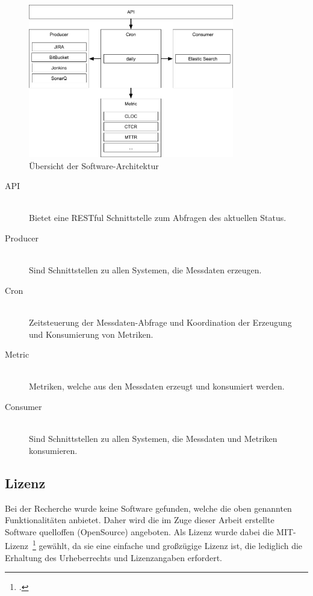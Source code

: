 \begin{savenotes}
    \begin{figure}[H] 
        \centering
            \includegraphics[width=0.8\textwidth]{img/architecture-overview.png}
        \caption{Übersicht der Software-Architektur}\label{fig:overview_architecture}
    \end{figure}
\end{savenotes}

\begin{description}
    \item[API] \hfill \\ Bietet eine RESTful Schnittstelle zum Abfragen des aktuellen Status.
    \item[Producer] \hfill \\ Sind Schnittstellen zu allen Systemen, die Messdaten erzeugen.
    \item[Cron] \hfill \\ Zeitsteuerung der Messdaten-Abfrage und Koordination der Erzeugung und Konsumierung von Metriken.
    \item[Metric] \hfill \\ Metriken, welche aus den Messdaten erzeugt und konsumiert werden.
    \item[Consumer] \hfill \\ Sind Schnittstellen zu allen Systemen, die Messdaten und Metriken konsumieren.
\end{description}

\subsection{Lizenz}

Bei der Recherche wurde keine Software gefunden, welche die oben genannten Funktionalitäten anbietet.
Daher wird die im Zuge dieser Arbeit erstellte Software quelloffen (OpenSource) angeboten.
Als Lizenz wurde dabei die MIT-Lizenz~\footcite{mit_license} gewählt, da sie eine einfache und großzügige Lizenz ist, die lediglich die Erhaltung des Urheberrechts und Lizenzangaben erfordert.

